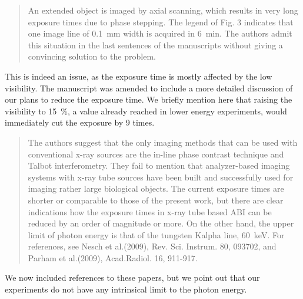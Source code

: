 \documentclass[a4paper,english]{scrartcl}
\begin{document}
\begin{quote}
    An extended object is imaged by axial scanning, which results in very
    long exposure times due to phase stepping.  The legend of Fig. 3
    indicates that one image line of \SI{0.1}{\milli\metre} width is
    acquired in \SI{6}{\minute}.  The authors admit this situation in the last sentences of the manuscripts without giving a convincing solution to the problem.
\end{quote}
This is indeed an issue, as the exposure time is mostly affected by the low visibility. The manuscript
was amended to include a more detailed discussion of our plans to reduce
the exposure time. We briefly mention here that raising the visibility to
\SI{15}{\percent}, a value already reached in lower energy experiments,
would immediately cut the exposure by \num{9} times.
\begin{quote}
    The authors suggest that the only imaging methods that can be used with
    conventional x-ray sources are the in-line phase contrast technique and
    Talbot interferometry. They fail to mention that analyzer-based imaging
    systems with x-ray tube sources have been built and successfully used
    for imaging rather large biological objects. The current exposure times
    are shorter or comparable to those of the present work, but there are
    clear indications how the exposure times in x-ray tube based ABI can be
    reduced by an order of magnitude or more. On the other hand, the upper
    limit of photon energy is that of the tungsten Kalpha line,
    \SI{60}{\kilo\eV}. For references, see Nesch et al.(2009), Rev. Sci.
    Instrum. 80, 093702, and Parham et al.(2009), Acad.Radiol. 16, 911-917.
\end{quote}
We now included references to these papers, but we point out that our
experiments do not have any intrinsical limit to the photon energy.
\end{document}
